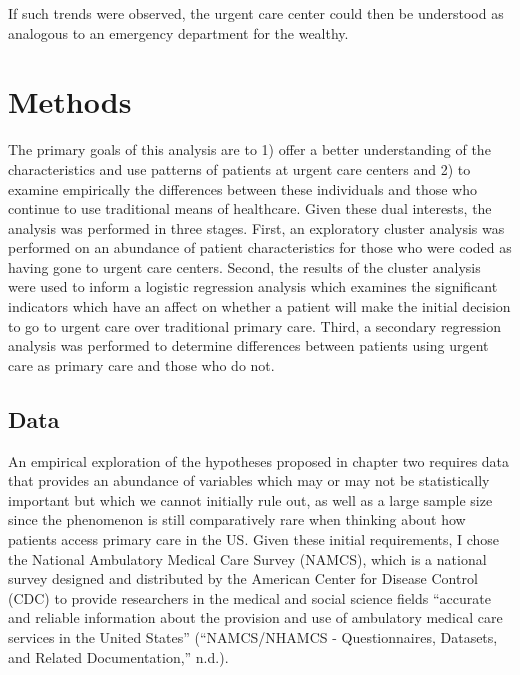 \documentclass[12pt,twoside]{reedthesis}
\begin{document}
  If such trends were observed, the urgent care center could then be
  understood as analogous to an emergency department for the wealthy.
  
  \chapter*{Methods}\label{methods}
  
  \onehalfspacing
  
  The primary goals of this analysis are to 1) offer a better
  understanding of the characteristics and use patterns of patients at
  urgent care centers and 2) to examine empirically the differences
  between these individuals and those who continue to use traditional
  means of healthcare. Given these dual interests, the analysis was
  performed in three stages. First, an exploratory cluster analysis was
  performed on an abundance of patient characteristics for those who were
  coded as having gone to urgent care centers. Second, the results of the
  cluster analysis were used to inform a logistic regression analysis
  which examines the significant indicators which have an affect on
  whether a patient will make the initial decision to go to urgent care
  over traditional primary care. Third, a secondary regression analysis
  was performed to determine differences between patients using urgent
  care as primary care and those who do not.
  
  \section*{Data}\label{data}
  
  An empirical exploration of the hypotheses proposed in chapter two
  requires data that provides an abundance of variables which may or may
  not be statistically important but which we cannot initially rule out,
  as well as a large sample size since the phenomenon is still
  comparatively rare when thinking about how patients access primary care
  in the US. Given these initial requirements, I chose the National
  Ambulatory Medical Care Survey (NAMCS), which is a national survey
  designed and distributed by the American Center for Disease Control
  (CDC) to provide researchers in the medical and social science fields
  ``accurate and reliable information about the provision and use of
  ambulatory medical care services in the United States'' (``NAMCS/NHAMCS
  - Questionnaires, Datasets, and Related Documentation,'' n.d.).
  
\end{document}
